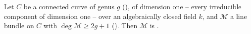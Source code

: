\begin{lemma}
\label{lem:pcb-degree-2g1-very-ample}
Let \(C\) be a connected  curve
of genus \(g\) (), of dimension one -- every
irreducible component of dimension one -- over an algebraically closed
field \(k\), and \(\mathcal M\) a line bundle on \(C\) with
\(\deg\mathcal M\geq2g+1\) ().  Then
\(\mathcal M\) is .
\end{lemma}

